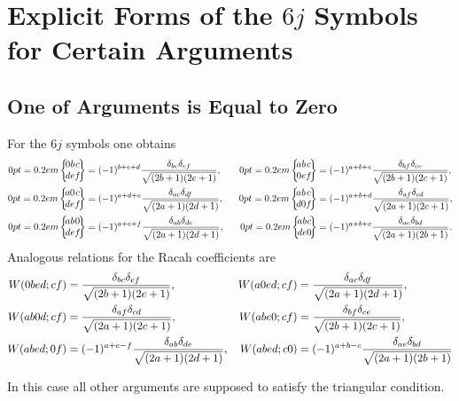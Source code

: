 \section{Explicit Forms of the $6 j$ Symbols for Certain Arguments}\label{sec:9.5}
\subsection{One of Arguments is Equal to Zero}\label{sec:9.5.1}
For the $6 j$ symbols one obtains
\begin{alignat}{2}
\sixj{0}{b}{c}{d}{e}{f}&=(-1)^{b+e+d} \frac{\delta_{b c} \delta_{e f}}{\sqrt{(2 b+1)(2 e+1)}}, \quad& \sixj{a}{b}{c}{0}{e}{f}&=(-1)^{a+b+e} \frac{\delta_{b f} \delta_{c e}}{\sqrt{(2 b+1)(2 c+1)}},\notag\\
\sixj{a}{0}{c}{d}{e}{f}&=(-1)^{a+d+e} \frac{\delta_{a c} \delta_{d f}}{\sqrt{(2 a+1)(2 d+1)}}, & \sixj{a}{b}{c}{d}{0}{f}&=(-1)^{a+b+d} \frac{\delta_{a f} \delta_{c d}}{\sqrt{(2 a+1)(2 c+1)}}, \notag\\
\sixj{a}{b}{0}{d}{e}{f}&=(-1)^{a+e+f} \frac{\delta_{a b} \delta_{d e}}{\sqrt{(2 a+1)(2 d+1)}}, & \sixj{a}{b}{c}{d}{e}{0}&=(-1)^{a+b+c} \frac{\delta_{a e} \delta_{b d}}{\sqrt{(2 a+1)(2 b+1)}} . \label{eq:9:5:1}
\end{alignat}
Analogous relations for the Racah coefficients are
\begin{alignat}{2}
W(0 b e d ; c f)&=\frac{\delta_{b c} \delta_{e f}}{\sqrt{(2 b+1)(2 e+1)}}, \quad& W(a 0 e d ; c f)&=\frac{\delta_{a c} \delta_{d f}}{\sqrt{(2 a+1)(2 d+1)}}, \notag\\
W(a b 0 d ; c f)&=\frac{\delta_{a f} \delta_{c d}}{\sqrt{(2 a+1)(2 c+1)}}, & W(a b e 0 ; c f)&=\frac{\delta_{b f} \delta_{c e}}{\sqrt{(2 b+1)(2 c+1)}}, \label{eq:9:5:2}\\
W(a b e d ; 0 f)&=(-1)^{a+e-f} \frac{\delta_{a b} \delta_{d e}}{\sqrt{(2 a+1)(2 d+1)}}, & W(a b e d ; c 0)&=(-1)^{a+b-c} \frac{\delta_{a e} \delta_{b d}}{\sqrt{(2 a+1)(2 b+1)}}\notag
\end{alignat}

In this case all other arguments are supposed to satisfy the triangular condition.

